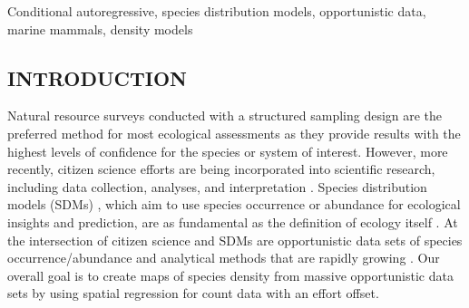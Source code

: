 \documentclass[11pt, titlepage]{article}
\begin{document}
 Conditional autoregressive, species distribution models, opportunistic data, marine mammals, density models\\




\begin{spacing}{1.9}
\begin{flushleft}
\setlength{\parindent}{1cm}
\setcounter{page}{0}


\section{INTRODUCTION}

Natural resource surveys conducted with a structured sampling design are the preferred method for most ecological assessments as they provide results with the highest levels of confidence for the species or system of interest. However, more recently, citizen science efforts are being incorporated into scientific research, including data collection, analyses, and interpretation \citep{miller-rushing_history_2012}. Species distribution models (SDMs) \citep{elith_species_2009, guisan_predicting_2013}, which aim to use species occurrence or abundance for ecological insights and prediction, are as fundamental as the definition of ecology itself \citep{Krebs1972Ecologyexperimentalanalysis}. At the intersection of citizen science and SDMs are opportunistic data sets of species occurrence/abundance \citep{soroye_opportunistic_2018} and analytical methods \citep{elith_novel_2006} that are rapidly growing \citep{renner_point_2015, lukyanenko_citizen_2020}.  Our overall goal is to create maps of species density from massive opportunistic data sets by using spatial regression for count data with an effort offset.


\end{flushleft}
\end{spacing}
\end{document}
